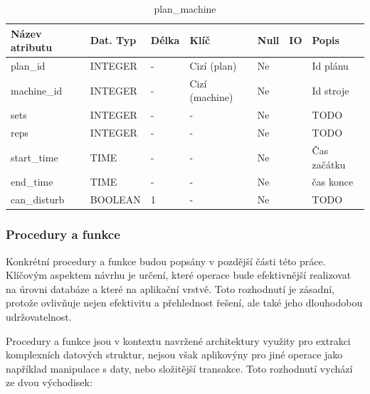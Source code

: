 \begin{table}[h!]
	\caption{plan\_machine}
    \label{tab:dat-dictionary-plan-machine}
	\begin{tabular}{|p{3.5cm}|p{2cm}|p{1cm}|p{2.5cm}|p{.75cm}|p{.5cm}|p{3.25cm}|}
		\hline
        \textbf{Název atributu} & \textbf{Dat. Typ} & \textbf{Délka} & \textbf{Klíč} & \textbf{Null} & \textbf{IO} & \textbf{Popis} \\
        \hline
            plan\_id        & INTEGER   &  -    & Cizí (plan)       & Ne &  & Id plánu \\
        \hline
            machine\_id     & INTEGER   &  -    & Cizí (machine)       & Ne &  & Id stroje \\
        \hline
            sets                & INTEGER   &  -   & -                 & Ne &  & TODO \\
        \hline
            reps                & INTEGER   &  -    & -                 & Ne &  &  TODO \\
            start\_time     & TIME      &  -    & -                 & Ne &  & Čas začátku \\
        \hline
            end\_time       & TIME      &  -    & -                 & Ne &  & čas konce \\
        \hline
            can\_disturb          & BOOLEAN   &  1    & -                 & Ne &  & TODO \\
        \hline
	\end{tabular}
\end{table}

\subsubsection{Procedury a funkce}
Konkrétní procedury a funkce budou popsány v pozdější části této práce. Klíčovým aspektem návrhu je určení, které operace bude efektivnější realizovat na úrovni databáze a které na aplikační vrstvě. Toto rozhodnutí je zásadní, protože ovlivňuje nejen efektivitu a přehlednost řešení, ale také jeho dlouhodobou udržovatelnost.

Procedury a funkce jsou v kontextu navržené architektury využity pro extrakci komplexních datových struktur, nejsou však aplikovýny pro jiné operace jako například manipulace s daty, nebo složitější transakce. Toto rozhodnutí vychází ze dvou východisek:

